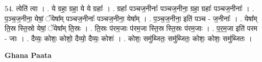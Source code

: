 \documentclass[17pt]{extarticle}
\begin{document}
54. त्वेति॑ त्वा । . ये ग्रहा॒ ग्रहा॒ ये ये ग्रहाः᳚ । . ग्रहाः᳚ पञ्चज॒नीनाः᳚ पञ्चज॒नीना॒ ग्रहा॒ ग्रहाः᳚ पञ्चज॒नीनाः᳚ । . प॒ञ्च॒ज॒नीना॒ येषां॒ ॅयेषा᳚म् पञ्चज॒नीनाः᳚ पञ्चज॒नीना॒ येषा᳚म् । . प॒ञ्च॒ज॒नीना॒ इति॑ पञ्च - ज॒नीनाः᳚ । . येषा᳚म् ति॒स्र स्ति॒स्रो येषां॒ ॅयेषा᳚म् ति॒स्रः । . ति॒स्रः प॑रम॒जाः प॑रम॒जा स्ति॒स्र स्ति॒स्रः प॑रम॒जाः । . प॒र॒म॒जा इति॑ परम - जाः । . दैव्यः॒ कोशः॒ कोशो॒ दैव्यो॒ दैव्यः॒ कोशः॑ । . कोशः॒ समु॑ब्जितः॒ समु॑ब्जितः॒ कोशः॒ कोशः॒ समु॑ब्जितः । \newline

\textbf{Ghana Paata } \newline
\end{document}

